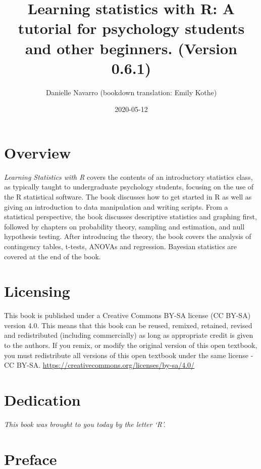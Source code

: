 \documentclass[]{book}
\title{Learning statistics with R: A tutorial for psychology students and other beginners. (Version 0.6.1)}
\author{Danielle Navarro (bookdown translation: Emily Kothe)}
\date{2020-05-12}
\begin{document}
\maketitle

{
\setcounter{tocdepth}{1}
\tableofcontents
}
\hypertarget{overview}{%
\chapter*{Overview}\label{overview}}

\emph{Learning Statistics with R} covers the contents of an introductory statistics class, as typically taught to undergraduate psychology students, focusing on the use of the R statistical software. The book discusses how to get started in R as well as giving an introduction to data manipulation and writing scripts. From a statistical perspective, the book discusses descriptive statistics and graphing ﬁrst, followed by chapters on probability theory, sampling and estimation, and null hypothesis testing. After introducing the theory, the book covers the analysis of contingency tables, t-tests, ANOVAs and regression. Bayesian statistics are covered at the end of the book.

\hypertarget{licensing}{%
\chapter*{Licensing}\label{licensing}}

This book is published under a Creative Commons BY-SA license (CC BY-SA) version 4.0. This means that this book can be reused, remixed, retained, revised and redistributed (including commercially) as long as appropriate credit is given to the authors. If you remix, or modify the original version of this open textbook, you must redistribute all versions of this open textbook under the same license - CC BY-SA.
\url{https://creativecommons.org/licenses/by-sa/4.0/}

\hypertarget{dedication}{%
\chapter*{Dedication}\label{dedication}}

\emph{This book was brought to you today by the letter `R'.}

\hypertarget{preface}{%
\chapter*{Preface}\label{preface}}
\end{document}
